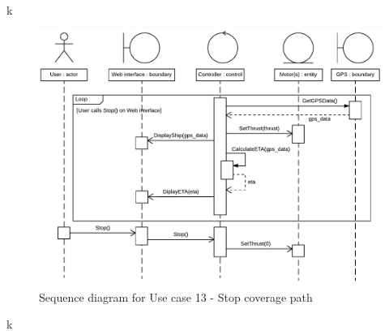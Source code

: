 k

\begin{figure}[H]
	\centering
	\includegraphics[width=1\linewidth]{Images/System_architecture/Use_case_13_SD}
	\caption{Sequence diagram for Use case 13 - Stop coverage path}
\end{figure}

k

